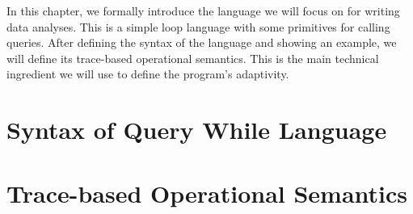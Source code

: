 In this chapter, we formally introduce the language we will focus on for writing data analyses.  
This is a simple loop language with some primitives for calling queries. 
After defining the syntax of the language and showing an example, we will define its trace-based operational semantics. 
This is the main technical ingredient we will use to define the program's adaptivity.

\section{Syntax of Query While Language}
\label{sec:language-syntax}

\section{Trace-based Operational Semantics}
\label{sec:language-os}

